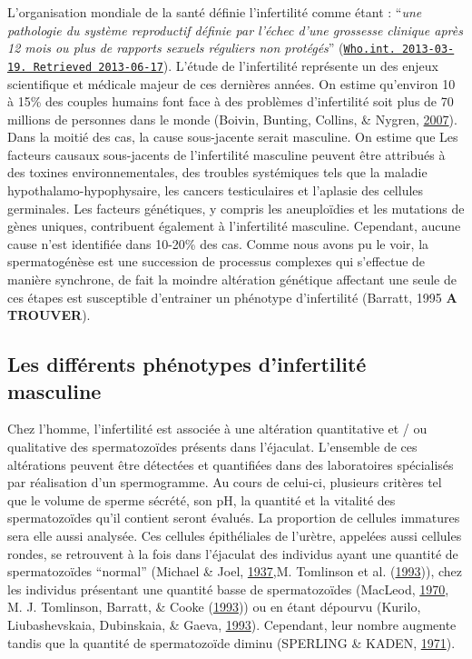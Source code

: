 \documentclass[12pt,twoside]{reedthesis}
\theoremstyle{definition}
\theoremstyle{definition}
\theoremstyle{remark}
\begin{document}
  L'organisation mondiale de la santé définie l'infertilité comme étant :
  ``\emph{une pathologie du système reproductif définie par l'échec d'une
  grossesse clinique après 12 mois ou plus de rapports sexuels réguliers
  non protégés}''
  (\href{http://www.who.int/reproductivehealth/topics/infertility/definitions/en/}{\texttt{Who.int.\ 2013-03-19.\ Retrieved\ 2013-06-17}}).
  L'étude de l'infertilité représente un des enjeux scientifique et
  médicale majeur de ces dernières années. On estime qu'environ 10 à 15\%
  des couples humains font face à des problèmes d'infertilité soit plus de
  70 millions de personnes dans le monde (Boivin, Bunting, Collins, \&
  Nygren, \protect\hyperlink{ref-Boivin2007a}{2007}). Dans la moitié des
  cas, la cause sous-jacente serait masculine. On estime que Les facteurs
  causaux sous-jacents de l'infertilité masculine peuvent être attribués à
  des toxines environnementales, des troubles systémiques tels que la
  maladie hypothalamo-hypophysaire, les cancers testiculaires et l'aplasie
  des cellules germinales. Les facteurs génétiques, y compris les
  aneuploïdies et les mutations de gènes uniques, contribuent également à
  l'infertilité masculine. Cependant, aucune cause n'est identifiée dans
  10-20\% des cas. Comme nous avons pu le voir, la spermatogénèse est une
  succession de processus complexes qui s'effectue de manière synchrone,
  de fait la moindre altération génétique affectant une seule de ces
  étapes est susceptible d'entrainer un phénotype d'infertilité (Barratt,
  1995 \textbf{A TROUVER}).
  
  \subsection{Les différents phénotypes d'infertilité
  masculine}\label{les-differents-phenotypes-dinfertilite-masculine}
  
  Chez l'homme, l'infertilité est associée à une altération quantitative
  et / ou qualitative des spermatozoïdes présents dans l'éjaculat.
  L'ensemble de ces altérations peuvent être détectées et quantifiées dans
  des laboratoires spécialisés par réalisation d'un spermogramme. Au cours
  de celui-ci, plusieurs critères tel que le volume de sperme sécrété, son
  pH, la quantité et la vitalité des spermatozoïdes qu'il contient seront
  évalués. La proportion de cellules immatures sera elle aussi analysée.
  Ces cellules épithéliales de l'urètre, appelées aussi cellules rondes,
  se retrouvent à la fois dans l'éjaculat des individus ayant une quantité
  de spermatozoïdes ``normal'' (Michael \& Joel,
  \protect\hyperlink{ref-Michael1937}{1937},M. Tomlinson et al.
  (\protect\hyperlink{ref-Tomlinson1993a}{1993})), chez les individus
  présentant une quantité basse de spermatozoïdes (MacLeod,
  \protect\hyperlink{ref-MacLeod1970}{1970}, M. J. Tomlinson, Barratt, \&
  Cooke (\protect\hyperlink{ref-Tomlinson1993}{1993})) ou en étant
  dépourvu (Kurilo, Liubashevskaia, Dubinskaia, \& Gaeva,
  \protect\hyperlink{ref-Kurilo}{1993}). Cependant, leur nombre augmente
  tandis que la quantité de spermatozoïde diminu (SPERLING \& KADEN,
  \protect\hyperlink{ref-SPERLING1971}{1971}).
  
\end{document}
